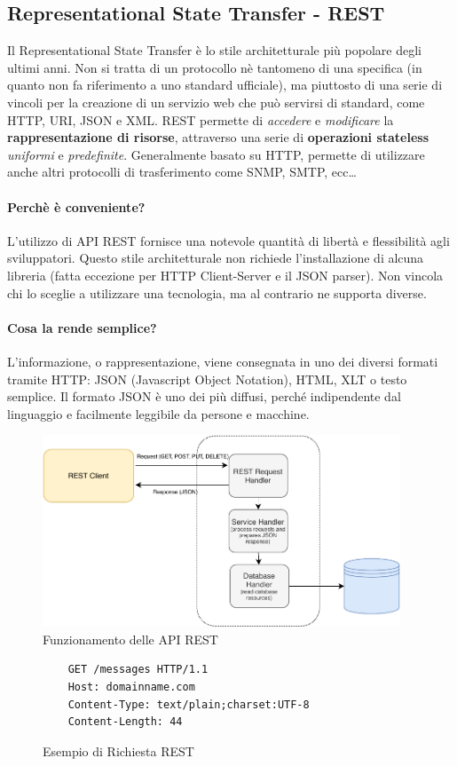 \subsection{Representational State Transfer - REST}
Il Representational State Transfer è lo stile architetturale più popolare degli ultimi anni. Non si tratta di un protocollo nè tantomeno di una specifica (in quanto non fa riferimento a uno standard ufficiale), ma piuttosto di una serie di vincoli per la creazione di un servizio web che può servirsi di standard,  come HTTP, URI, JSON e XML. REST permette di \textit{accedere} e \textit{modificare} la \textbf{rappresentazione di risorse}, attraverso una serie di \textbf{operazioni stateless} \textit{uniformi} e \textit{predefinite}. Generalmente basato su HTTP, permette di utilizzare anche altri protocolli di trasferimento come SNMP, SMTP, ecc\dots

\paragraph{Perchè è conveniente?} L'utilizzo di API REST fornisce una notevole quantità di libertà e flessibilità agli sviluppatori. Questo stile architetturale non richiede l'installazione di alcuna libreria (fatta eccezione per HTTP Client-Server e il JSON parser). Non vincola  chi lo sceglie a utilizzare una tecnologia, ma al contrario ne supporta diverse.

\paragraph{Cosa la rende semplice?} L'informazione, o rappresentazione, viene consegnata in uno dei diversi formati tramite HTTP: JSON (Javascript Object Notation), HTML, XLT o testo semplice. Il formato JSON è uno dei più diffusi, perché indipendente dal linguaggio e facilmente leggibile da persone e macchine.
\begin{figure}[H]
    \centering
    \includegraphics[width=0.95\textwidth]{images/01_10_restapi.pdf}
    \caption{Funzionamento delle API REST}
    \label{fig:restapi}
\end{figure}
\begin{figure}[H]
    \begin{verbatim}
    GET /messages HTTP/1.1
    Host: domainname.com
    Content-Type: text/plain;charset:UTF-8
    Content-Length: 44
\end{verbatim}
    \caption{Esempio di Richiesta REST}
    \label{fig:restrequest}
\end{figure}

